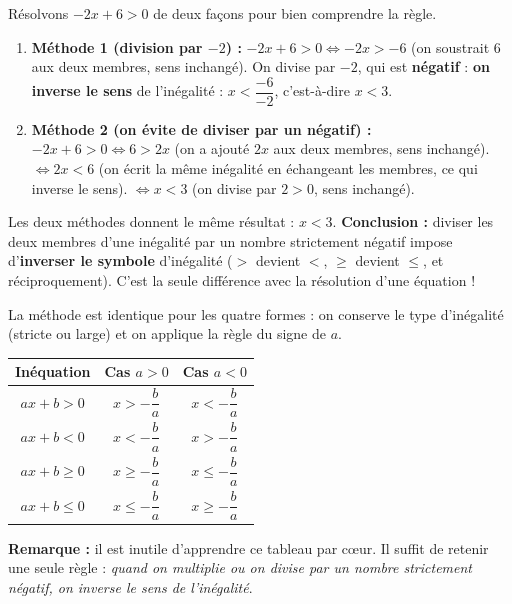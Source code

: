 \documentclass[11pt]{article}
\begin{document}
\begin{experience}
Résolvons $-2x + 6 > 0$ de deux façons pour bien comprendre la règle.
\begin{enumerate}
    \item \textbf{Méthode 1 (division par $-2$) :}
    $-2x + 6 > 0 \iff -2x > -6$ (on soustrait $6$ aux deux membres, sens inchangé).
    On divise par $-2$, qui est \textbf{négatif} : \textbf{on inverse le sens} de l'inégalité : $x < \dfrac{-6}{-2}$, c'est-à-dire $x < 3$.
    \item \textbf{Méthode 2 (on évite de diviser par un négatif) :}
    $-2x + 6 > 0 \iff 6 > 2x$ (on a ajouté $2x$ aux deux membres, sens inchangé).
    $\iff 2x < 6$ (on écrit la même inégalité en échangeant les membres, ce qui inverse le sens).
    $\iff x < 3$ (on divise par $2 > 0$, sens inchangé).
\end{enumerate}
Les deux méthodes donnent le même résultat : $x < 3$. \textbf{Conclusion :} diviser les deux membres d'une inégalité par un nombre strictement négatif impose d'\textbf{inverser le symbole} d'inégalité ($>$ devient $<$, $\geq$ devient $\leq$, et réciproquement). C'est la seule différence avec la résolution d'une équation !
\end{experience}

\begin{propriete}
La méthode est identique pour les quatre formes : on conserve le type d'inégalité (stricte ou large) et on applique la règle du signe de $a$.
\begin{center}
\begin{tabular}{|c|c|c|}\hline
\rowcolor{popblueL}
\textbf{Inéquation} & \textbf{Cas $a > 0$} & \textbf{Cas $a < 0$} \\ \hline
$ax + b > 0$ & $x > -\dfrac{b}{a}$ & $x < -\dfrac{b}{a}$ \\ \hline
$ax + b < 0$ & $x < -\dfrac{b}{a}$ & $x > -\dfrac{b}{a}$ \\ \hline
$ax + b \geq 0$ & $x \geq -\dfrac{b}{a}$ & $x \leq -\dfrac{b}{a}$ \\ \hline
$ax + b \leq 0$ & $x \leq -\dfrac{b}{a}$ & $x \geq -\dfrac{b}{a}$ \\ \hline
\end{tabular}
\end{center}
\textbf{Remarque :} il est inutile d'apprendre ce tableau par cœur. Il suffit de retenir une seule règle : \emph{quand on multiplie ou on divise par un nombre strictement négatif, on inverse le sens de l'inégalité}.
\end{propriete}
\end{document}
